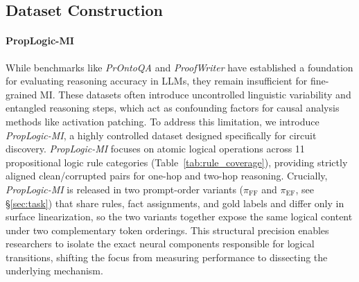 \documentclass[11pt]{article}
\begin{document}
\subsection{Dataset Construction}
\label{sec:dataset}
\paragraph{PropLogic-MI}
While benchmarks like \textit{PrOntoQA} and \textit{ProofWriter} have established a foundation for evaluating reasoning accuracy in LLMs, they remain insufficient for fine-grained MI. These datasets often introduce uncontrolled linguistic variability and entangled reasoning steps, which act as confounding factors for causal analysis methods like activation patching. 
To address this limitation, we introduce \textit{PropLogic-MI}, a highly controlled dataset designed specifically for circuit discovery. \textit{PropLogic-MI} focuses on atomic logical operations across 11 propositional logic rule categories (Table~\ref{tab:rule_coverage}), providing strictly aligned clean/corrupted pairs for one-hop and two-hop reasoning. Crucially, \textit{PropLogic-MI} is released in two prompt-order variants ($\pi_{\mathrm{FF}}$ and $\pi_{\mathrm{EF}}$, see \S\ref{sec:task}) that share rules, fact assignments, and gold labels and differ only in surface linearization, so the two variants together expose the same logical content under two complementary token orderings. This structural precision enables researchers to isolate the exact neural components responsible for logical transitions, shifting the focus from measuring performance to dissecting the underlying mechanism.

\end{document}
